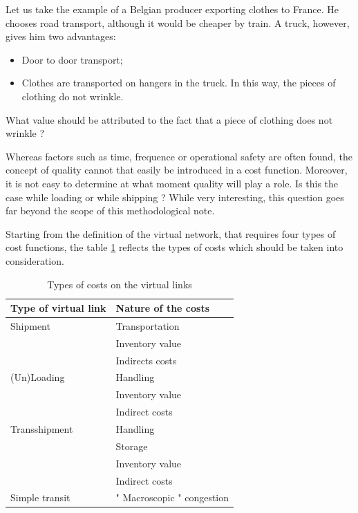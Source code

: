 Let us take the example of a Belgian producer exporting clothes to France.  He
chooses road transport, although it would be cheaper by
train.  A truck, however, gives him two advantages:


\begin{itemize}
\item Door to door transport;
\item Clothes are transported on hangers in the truck.
In this way, the pieces of clothing do not wrinkle.
\end{itemize}


What value should be attributed to the fact that a piece of clothing does not
wrinkle ?

Whereas factors such as time, frequence or operational safety are often found,
the concept of quality cannot that easily be introduced in a cost function.
Moreover, it is not easy to determine at what moment quality will play a role.
Is this the case while loading or while shipping ? While very interesting, this question goes 
far beyond the scope of this methodological note.

Starting from the definition of the virtual network, that requires four types of
cost functions, the table \ref{tab4_2} reflects the types of costs which
should be taken into consideration.


\begin{table}[htbp]
\begin{center}
\begin{tabular}{ll}
\hline

Type of virtual link    &Nature of the costs\\
\hline
Shipment            & Transportation\\
                    & Inventory value\\
                    & Indirects costs\\

(Un)Loading      & Handling\\
                    & Inventory value\\
                    & Indirect costs\\


Transshipment   & Handling\\
                & Storage\\
                & Inventory value\\
                & Indirect costs\\

Simple transit             & " Macroscopic " congestion \\
\hline
\end{tabular}
\caption{\label{tab4_2} Types of costs on the virtual links}
\end{center}
\end{table}

